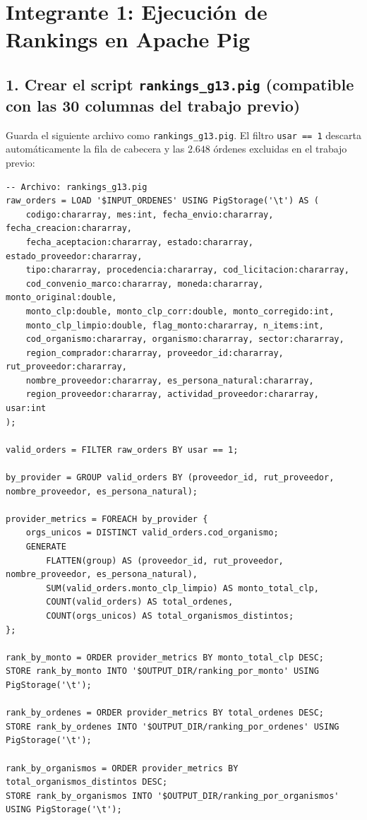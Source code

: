\documentclass[10pt,letterpaper]{article}
\begin{document}
\section{Integrante 1: Ejecución de Rankings en Apache Pig}

\subsection{1. Crear el script \texttt{rankings\_g13.pig} (compatible con las 30 columnas del trabajo previo)}
Guarda el siguiente archivo como \texttt{rankings\_g13.pig}. El filtro \texttt{usar == 1} descarta automáticamente la fila de cabecera y las $2.648$ órdenes excluidas en el trabajo previo:

\begin{lstlisting}[style=clusterstyle]
-- Archivo: rankings_g13.pig
raw_orders = LOAD '$INPUT_ORDENES' USING PigStorage('\t') AS (
    codigo:chararray, mes:int, fecha_envio:chararray, fecha_creacion:chararray,
    fecha_aceptacion:chararray, estado:chararray, estado_proveedor:chararray,
    tipo:chararray, procedencia:chararray, cod_licitacion:chararray,
    cod_convenio_marco:chararray, moneda:chararray, monto_original:double,
    monto_clp:double, monto_clp_corr:double, monto_corregido:int,
    monto_clp_limpio:double, flag_monto:chararray, n_items:int,
    cod_organismo:chararray, organismo:chararray, sector:chararray,
    region_comprador:chararray, proveedor_id:chararray, rut_proveedor:chararray,
    nombre_proveedor:chararray, es_persona_natural:chararray,
    region_proveedor:chararray, actividad_proveedor:chararray, usar:int
);

valid_orders = FILTER raw_orders BY usar == 1;

by_provider = GROUP valid_orders BY (proveedor_id, rut_proveedor, nombre_proveedor, es_persona_natural);

provider_metrics = FOREACH by_provider {
    orgs_unicos = DISTINCT valid_orders.cod_organismo;
    GENERATE
        FLATTEN(group) AS (proveedor_id, rut_proveedor, nombre_proveedor, es_persona_natural),
        SUM(valid_orders.monto_clp_limpio) AS monto_total_clp,
        COUNT(valid_orders) AS total_ordenes,
        COUNT(orgs_unicos) AS total_organismos_distintos;
};

rank_by_monto = ORDER provider_metrics BY monto_total_clp DESC;
STORE rank_by_monto INTO '$OUTPUT_DIR/ranking_por_monto' USING PigStorage('\t');

rank_by_ordenes = ORDER provider_metrics BY total_ordenes DESC;
STORE rank_by_ordenes INTO '$OUTPUT_DIR/ranking_por_ordenes' USING PigStorage('\t');

rank_by_organismos = ORDER provider_metrics BY total_organismos_distintos DESC;
STORE rank_by_organismos INTO '$OUTPUT_DIR/ranking_por_organismos' USING PigStorage('\t');
\end{lstlisting}
\end{document}
